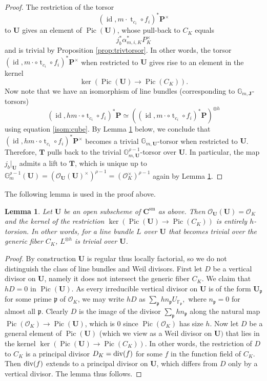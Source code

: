 \documentclass[11pt,oneside]{amsart}
\theoremstyle{plain}
\newtheorem{lemma}[theorem]{Lemma}
\theoremstyle{definition}
\def\lra{{\longrightarrow}}
\def\G{{\bf G}}
\DeclareMathOperator{\sm}{sm}
\DeclareMathOperator{\Pic}{Pic}
\DeclareMathOperator{\id}{id} \DeclareMathOperator{\Sel}{Sel}
\DeclareMathOperator{\tr}{t}
\def\TT{\mathbf{T}}
\def\F{\mathbb{F}}
\def\J{\mathbf{J}}
\def\G{\mathbb{G}}
\def\P{\mathbf{P}}
\def\CC{\mathbf{C}}
\def\ra{\rightarrow}
\def\U{\mathbf{U}}
\def\oh{\mathcal{O}}
\begin{document}
\begin{proof}
The restriction of the torsor
$$(\id, m\cdot \tr_{c_i} \circ f_i)^* \P^\times$$ to $\U$ gives an element of $\Pic(\U)$, whose pull-back to $C_K$ equals 
$$j_{b}^*\alpha_{m, i, K}^*P_K^{\times}$$ and is trivial by Proposition \ref{prop:trivtorsor}. In other words, the torsor $(\id, m\cdot \circ \tr_{c_i} \circ f_i)^* \P^\times$  when restricted to $\U$ gives rise to an element in the kernel 
$$\ker (\Pic (\U) \lra \Pic (C_K)).$$
Now note that we have an isomorphism of line bundles (corresponding to $\G_{m, \J}$-torsors)  
\begin{equation}
    (\id, hm\cdot \circ \tr_{c_i} \circ f_i)^*\P  \simeq ((\id, m\cdot \circ \tr_{c_i} \circ f_i)^* \P)^{\otimes h}
\end{equation}
using equation \ref{isom:cube}. By Lemma \ref{lem:PicU} below, we conclude that $(\id, hm\cdot \circ \tr_{c_i} \circ f_i)^* \P^\times$ becomes a trivial $\G_{m, \U}$-torsor when restricted to $\U$. Therefore, $\TT$ pulls back to the trivial $\G_{m, \U}^{\rho-1}$-torsor over $\U$. In particular, the map $j_b\vert_{\U}$ admits a lift to $\TT$, which is unique up to $\G_m^{\rho-1}(\U)=(\oh_\U(\U)^\times)^{\rho-1}=(\oh_K^{\times})^{\rho-1}$ again by Lemma \ref{lem:PicU}. 
\end{proof}
 
The following lemma is used in the proof above. 

\begin{lemma}\label{lem:PicU}
Let $\U$ be an open subscheme of $\CC^{\sm}$ as above. Then $\oh_{\U}(\U)=\oh_K$ and the kernel of the restriction $\ker(\Pic(\U)\lra  \Pic(C_K))$ is entirely $h$-torsion. In other words, for a line bundle $L$ over $\U$ that becomes trivial over the generic fiber $C_K$, $L^{\otimes h}$ is trivial over $\U$. 
\end{lemma}

\begin{proof}
By construction $\U$ is regular thus locally factorial, so we do not distinguish the class of line bundles and Weil divisors.  First let $D$ be a vertical divisor on $\U$, namely it does not intersect the generic fiber $C_K$. We claim that $h D = 0$ in $\Pic (\U)$. As every irreducible vertical divisor on $\U$ is of the form $\U_\mathfrak{p}$ for some prime $\mathfrak{p}$ of $\oh_K$,  we may write $h D$ as 
$\sum_{\mathfrak{p}} h n_\mathfrak{p} U_{\F_\mathfrak{p}},$ where $n_{\mathfrak{p}}=0$ for almost all $\mathfrak{p}$. Clearly $D$ is the image of the divisor $\sum_{\mathfrak{p}} h n_{\mathfrak p}$ along the natural map $\Pic (\oh_K) \ra \Pic (\U)$, which is $0$ since $\Pic (\oh_K)$ has size $h$. Now let $D$ be a general element of $\Pic(\U)$ (which we view as a Weil divisor on $\U)$ that lies in the kernel $\ker (\Pic (\U) \rightarrow \Pic (C_K))$. In other words, the restriction of $D$ to $C_K$ is a principal divisor $D_K = \textup{div} (f)$ for some $f$ in the function field of $C_K$. Then $\textup{div} (f)$ extends to a principal divisor on $\U$, which differs from $D$ only by a vertical divisor. The lemma thus follows.  
\end{proof}
\end{document}
